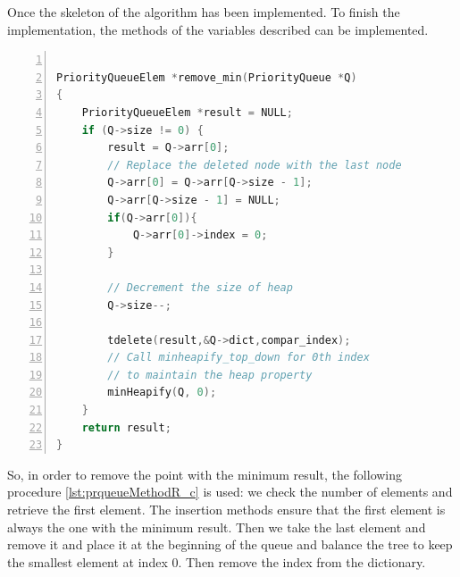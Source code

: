 Once the skeleton of the algorithm has been implemented. To finish the implementation, the methods of the variables described can be implemented. 

\begin{lstlisting}[float=h,language=C, % Spécifie le langage du code
	caption={PriorityQueue Remove Min}, % Légende du listing
	label=lst:prqueueMethodR_c, % Étiquette pour référencer le listing
	numbers=left,
	numberstyle=\tiny\color{gray},
	stepnumber=1,
	frame=single,
	breaklines=true,
	postbreak=\mbox{\textcolor{red}{$\hookrightarrow$}\space},
	showstringspaces=false
]
	
PriorityQueueElem *remove_min(PriorityQueue *Q)
{
	PriorityQueueElem *result = NULL;
	if (Q->size != 0) {
		result = Q->arr[0];
		// Replace the deleted node with the last node
		Q->arr[0] = Q->arr[Q->size - 1];
		Q->arr[Q->size - 1] = NULL;
		if(Q->arr[0]){
			Q->arr[0]->index = 0;
		}
		
		// Decrement the size of heap
		Q->size--;
		
		tdelete(result,&Q->dict,compar_index);
		// Call minheapify_top_down for 0th index
		// to maintain the heap property
		minHeapify(Q, 0);
	}
	return result;
}
\end{lstlisting}

So, in order to remove the point with the minimum result, the following procedure \ref{lst:prqueueMethodR_c} is used: we check the number of elements and retrieve the first element. The insertion methods ensure that the first element is always the one with the minimum result. Then we take the last element and remove it and place it at the beginning of the queue and balance the tree to keep the smallest element at index 0. Then remove the index from the dictionary. 



